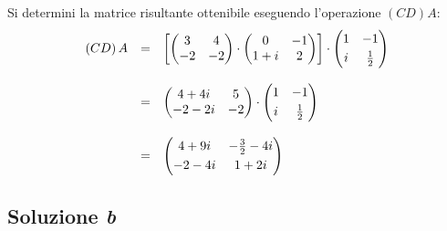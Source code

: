 \documentclass[a4paper]{article}
\makeatletter
\newenvironment{rowequmat}[1]{\left(\array{@{}#1@{}}}{\endarray\right)}
\makeatother
\begin{document}
	Si determini la matrice risultante ottenibile eseguendo l'operazione $\left(CD\right)A$:
	\begin{equation*}
		\begin{array}{lll}
			\left(CD\right)A & = &
			\left[ \begin{rowequmat}{cc}
				3 & 4 \\
				-2 & -2
			\end{rowequmat} \cdot \begin{rowequmat}{cc}
				0 & -1 \\
				1+i & 2
			\end{rowequmat} \right] \cdot \begin{rowequmat}{cc}
				1 & -1 \\ [0.3em]
				i & \frac{1}{2}
			\end{rowequmat} \\
			\\
			&=& \begin{rowequmat}{cc}
				4+4i & 5 \\
				-2-2i & -2
			\end{rowequmat} \cdot \begin{rowequmat}{cc}
				1 & -1 \\ [0.3em]
				i & \frac{1}{2}
			\end{rowequmat} \\
			\\
			&=& \begin{rowequmat}{cc}
				4+9i  & -\frac{3}{2}-4i \\ [0.3em]
				-2-4i & 1+2i
			\end{rowequmat}
		\end{array}
	\end{equation*}
	
	\subsection{Soluzione \emph{b}}
	
\end{document}
